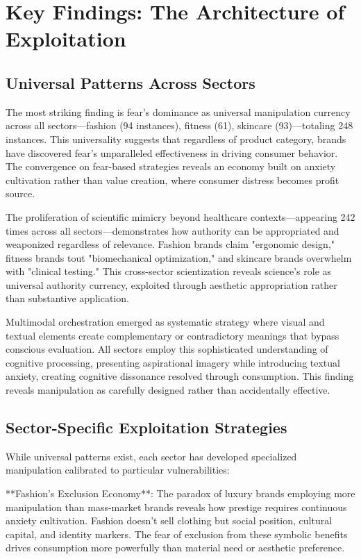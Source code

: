 \section{Key Findings: The Architecture of Exploitation}
\label{sec:key_findings}

\subsection{Universal Patterns Across Sectors}

The most striking finding is fear's dominance as universal manipulation currency across all sectors—fashion (94 instances), fitness (61), skincare (93)—totaling 248 instances. This universality suggests that regardless of product category, brands have discovered fear's unparalleled effectiveness in driving consumer behavior. The convergence on fear-based strategies reveals an economy built on anxiety cultivation rather than value creation, where consumer distress becomes profit source.

The proliferation of scientific mimicry beyond healthcare contexts—appearing 242 times across all sectors—demonstrates how authority can be appropriated and weaponized regardless of relevance. Fashion brands claim "ergonomic design," fitness brands tout "biomechanical optimization," and skincare brands overwhelm with "clinical testing." This cross-sector scientization reveals science's role as universal authority currency, exploited through aesthetic appropriation rather than substantive application.

Multimodal orchestration emerged as systematic strategy where visual and textual elements create complementary or contradictory meanings that bypass conscious evaluation. All sectors employ this sophisticated understanding of cognitive processing, presenting aspirational imagery while introducing textual anxiety, creating cognitive dissonance resolved through consumption. This finding reveals manipulation as carefully designed rather than accidentally effective.

\subsection{Sector-Specific Exploitation Strategies}

While universal patterns exist, each sector has developed specialized manipulation calibrated to particular vulnerabilities:

**Fashion's Exclusion Economy**: The paradox of luxury brands employing more manipulation than mass-market brands reveals how prestige requires continuous anxiety cultivation. Fashion doesn't sell clothing but social position, cultural capital, and identity markers. The fear of exclusion from these symbolic benefits drives consumption more powerfully than material need or aesthetic preference.

